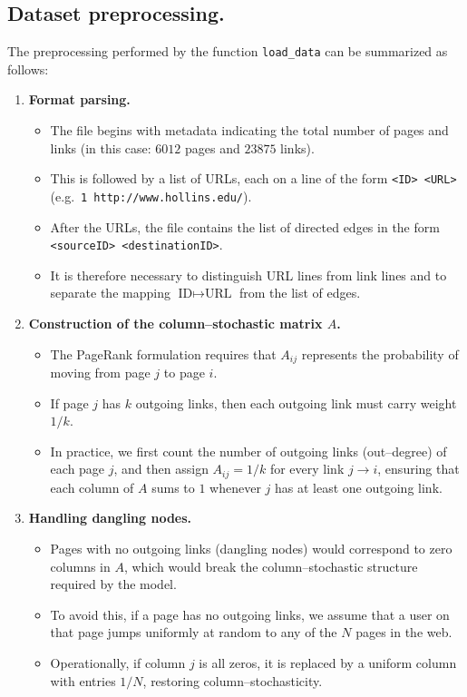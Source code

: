 \documentclass[11pt]{article}
\begin{document}
\subsection{Dataset preprocessing.}
The preprocessing performed by the function \texttt{load\_data} can be
summarized as follows:

\begin{enumerate}
    \item \textbf{Format parsing.}
    \begin{itemize}
        \item The file begins with metadata indicating the total number of pages
              and links (in this case: \(6012\) pages and \(23875\) links).
        \item This is followed by a list of URLs, each on a line of the form
              \texttt{<ID> <URL>} (e.g.\ \texttt{1 http://www.hollins.edu/}).
        \item After the URLs, the file contains the list of directed edges in
              the form \texttt{<sourceID> <destinationID>}.
        \item It is therefore necessary to distinguish URL lines from link
              lines and to separate the mapping \(\text{ID} \mapsto \text{URL}\) 
              from the list of edges.
    \end{itemize}

    \item \textbf{Construction of the column--stochastic matrix \(A\).}
    \begin{itemize}
        \item The PageRank formulation requires that \(A_{ij}\) represents the
              probability of moving from page \(j\) to page \(i\).
        \item If page \(j\) has \(k\) outgoing links, then each outgoing link
              must carry weight \(1/k\).
        \item In practice, we first count the number of outgoing links
              (out--degree) of each page \(j\), and then assign
              \(A_{ij} = 1/k\) for every link \(j \to i\), ensuring that each
              column of \(A\) sums to \(1\) whenever \(j\) has at least one
              outgoing link.
    \end{itemize}

    \item \textbf{Handling dangling nodes.}
    \begin{itemize}
        \item Pages with no outgoing links (dangling nodes) would correspond to
              zero columns in \(A\), which would break the column--stochastic
              structure required by the model.
        \item To avoid this, if a page has no outgoing links, we assume that
              a user on that page jumps uniformly at random to any of the
              \(N\) pages in the web.
        \item Operationally, if column \(j\) is all zeros, it is replaced by a
              uniform column with entries \(1/N\), restoring column--stochasticity.
    \end{itemize}
\end{enumerate}
\end{document}
